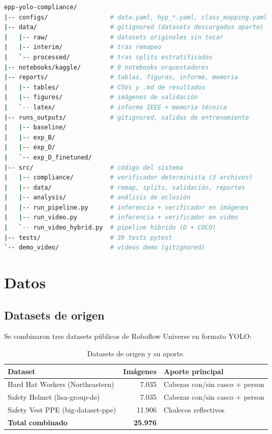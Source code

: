 \documentclass[11pt,a4paper]{article}
\begin{document}
\begin{lstlisting}[language=bash, basicstyle=\ttfamily\scriptsize, caption={Estructura del repositorio Git.}]
epp-yolo-compliance/
|-- configs/                 # data.yaml, hyp_*.yaml, class_mapping.yaml
|-- data/                    # gitignored (datasets descargados aparte)
|   |-- raw/                 # datasets originales sin tocar
|   |-- interim/             # tras remapeo
|   `-- processed/           # tras splits estratificados
|-- notebooks/kaggle/        # 9 notebooks orquestadores
|-- reports/                 # tablas, figuras, informe, memoria
|   |-- tables/              # CSVs y .md de resultados
|   |-- figures/             # imágenes de validación
|   `-- latex/               # informe IEEE + memoria técnica
|-- runs_outputs/            # gitignored, salidas de entrenamiento
|   |-- baseline/
|   |-- exp_B/
|   |-- exp_D/
|   `-- exp_D_finetuned/
|-- src/                     # código del sistema
|   |-- compliance/          # verificador determinista (3 archivos)
|   |-- data/                # remap, splits, validación, reportes
|   |-- analysis/            # análisis de oclusión
|   |-- run_pipeline.py      # inferencia + verificador en imágenes
|   |-- run_video.py         # inferencia + verificador en video
|   `-- run_video_hybrid.py  # pipeline híbrido (D + COCO)
|-- tests/                   # 39 tests pytest
`-- demo_video/              # videos demo (gitignored)
\end{lstlisting}

\section{Datos}

\subsection{Datasets de origen}

Se combinaron tres datasets públicos de Roboflow Universe en formato
YOLO\@:

\begin{table}[H]
\centering
\caption{Datasets de origen y su aporte.}
\begin{tabular}{l r p{5.5cm}}
\toprule
\textbf{Dataset} & \textbf{Imágenes} & \textbf{Aporte principal} \\
\midrule
Hard Hat Workers (Northeastern) & 7.035 & Cabezas con/sin casco + person \\
Safety Helmet (lisa-group-de) & 7.035 & Cabezas con/sin casco + person \\
Safety Vest PPE (big-dataset-ppe) & 11.906 & Chalecos reflectivos \\
\midrule
\textbf{Total combinado} & \textbf{25.976} & \\
\bottomrule
\end{tabular}
\end{table}
\end{document}
